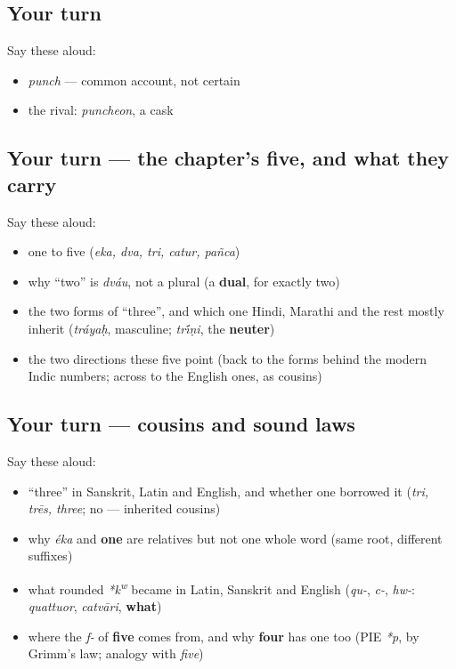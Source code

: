 \subsection*{Your turn}
Say these aloud:

\begin{itemize}
\raggedright
  \item \emph{punch} — common account, not certain
  \item the rival: \emph{puncheon}, a cask
\end{itemize}

\subsection*{Your turn — the chapter's five, and what they carry}
Say these aloud:

\begin{itemize}
\raggedright
  \item one to five (\emph{eka, dva, tri, catur, pañca})
  \item why \textquotedblleft{}two\textquotedblright{} is \emph{dváu}, not a plural (a \textbf{dual}, for exactly two)
  \item the two forms of \textquotedblleft{}three\textquotedblright{}, and which one Hindi, Marathi and the rest mostly inherit (\emph{tráyaḥ}, masculine; \emph{tr\'{\={\i}}ṇi}, the \textbf{neuter})
  \item the two directions these five point (back to the forms behind the modern Indic numbers; across to the English ones, as cousins)
\end{itemize}

\subsection*{Your turn — cousins and sound laws}
Say these aloud:

\begin{itemize}
\raggedright
  \item \textquotedblleft{}three\textquotedblright{} in Sanskrit, Latin and English, and whether one borrowed it (\emph{tri, trēs, three}; no — inherited cousins)
  \item why \emph{éka} and \textbf{one} are relatives but not one whole word (same root, different suffixes)
  \item what rounded \emph{*k\textsuperscript{w}} became in Latin, Sanskrit and English (\emph{qu-}, \emph{c-}, \emph{hw-}: \emph{quattuor}, \emph{catvāri}, \textbf{what})
  \item where the \emph{f-} of \textbf{five} comes from, and why \textbf{four} has one too (PIE \emph{*p}, by Grimm's law; analogy with \emph{five})
\end{itemize}

